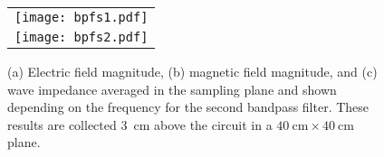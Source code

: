 \begin{figure}
	\centering
	\begin{tabular}{c}
		\texttt{[image: bpfs1.pdf]}\\
		\texttt{[image: bpfs2.pdf]}
	\end{tabular}
	\caption{Near-field simulation results collected \SI{1}{\centi\meter} above the circuit in a $\SI{10}{\centi\meter} \times \SI{10}{\centi\meter}$ plane for the second bandpass filter.}
	\label{fig:bpfs_sim2}
	\centering
	\hfill
	\par 
	\caption{(a) Electric field magnitude, (b) magnetic field magnitude, and (c) wave impedance averaged in the sampling plane and shown depending on the frequency for the second bandpass filter. These results are collected \SI{3}{\centi\meter} above the circuit in a $\SI{40}{\centi\meter} \times \SI{40}{\centi\meter}$ plane.}
	\label{fig:bpfs_sim3}
\end{figure}
\FloatBarrier
